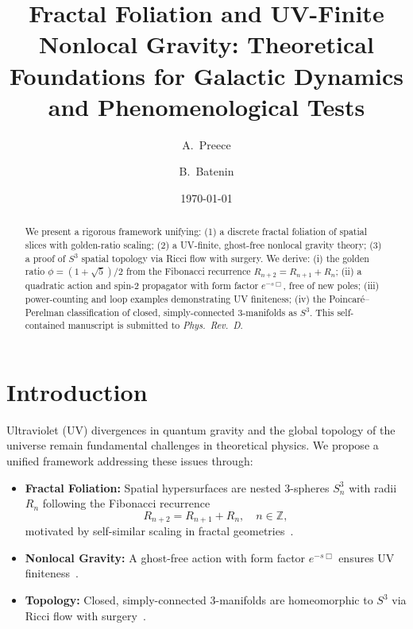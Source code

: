 \documentclass[
  prd,
  aps,
  twocolumn,
  superscriptaddress,
  nofootinbib,
  longbibliography
]{revtex4-2}
\newcommand{\vp}{\phi}
\newcommand{\BoxOp}{\mathrm{\Box}}
\begin{document}
\title{Fractal Foliation and UV-Finite Nonlocal Gravity: Theoretical Foundations for Galactic Dynamics and Phenomenological Tests}

\author{A.~Preece}

\author{B.~Batenin}

\date{\today}

\begin{abstract}
We present a rigorous framework unifying: (1) a discrete fractal foliation of spatial slices with golden-ratio scaling; (2) a UV-finite, ghost-free nonlocal gravity theory; (3) a proof of \( S^3 \) spatial topology via Ricci flow with surgery. We derive: (i) the golden ratio \(\vp = (1 + \sqrt{5})/2\) from the Fibonacci recurrence \( R_{n+2} = R_{n+1} + R_n \); (ii) a quadratic action and spin-2 propagator with form factor \( e^{-s \BoxOp} \), free of new poles; (iii) power-counting and loop examples demonstrating UV finiteness; (iv) the Poincaré–Perelman classification of closed, simply-connected 3-manifolds as \( S^3 \). This self-contained manuscript is submitted to \textit{Phys.\ Rev.\ D}.
\end{abstract}

\maketitle

\section{Introduction}
Ultraviolet (UV) divergences in quantum gravity and the global topology of the universe remain fundamental challenges in theoretical physics. We propose a unified framework addressing these issues through:

\begin{itemize}
  \item \textbf{Fractal Foliation:} Spatial hypersurfaces are nested 3-spheres \( S^3_n \) with radii \( R_n \) following the Fibonacci recurrence
  \[
    R_{n+2} = R_{n+1} + R_n, \quad n \in \mathbb{Z},
  \]
  motivated by self-similar scaling in fractal geometries~\cite{Mandelbrot1982}.
  \item \textbf{Nonlocal Gravity:} A ghost-free action with form factor \( e^{-s \BoxOp} \) ensures UV finiteness~\cite{Modesto2012}.
  \item \textbf{Topology:} Closed, simply-connected 3-manifolds are homeomorphic to \( S^3 \) via Ricci flow with surgery~\cite{Perelman2002}.
\end{itemize}
\end{document}
